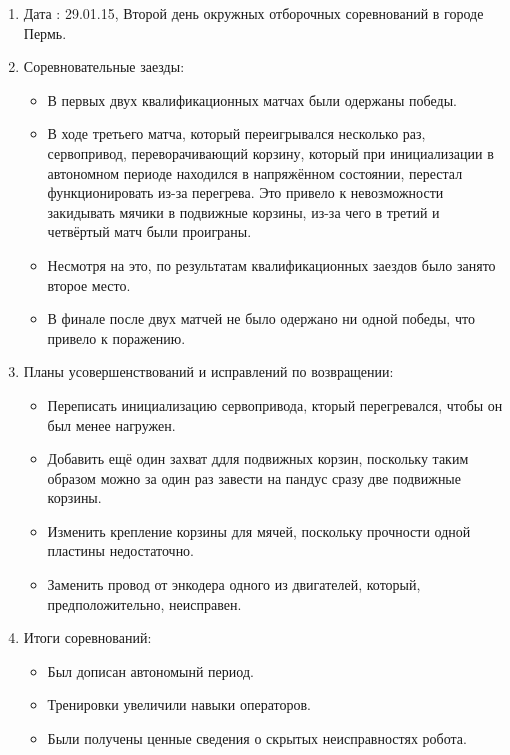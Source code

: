 \begin{enumerate}
  	
  \item Дата : 29.01.15, Второй день окружных отборочных соревнований в городе Пермь.
  
  \item Соревновательные заезды:
  \begin{itemize}
    \item В первых двух квалификационных матчах были одержаны победы.
		
	\item В ходе третьего матча, который переигрывался несколько раз, сервопривод, переворачивающий корзину, который при инициализации в автономном периоде находился в напряжённом состоянии, перестал функционировать из-за перегрева. Это привело к невозможности закидывать мячики в подвижные корзины, из-за чего в третий и четвёртый матч были проиграны.
	
	\item Несмотря на это, по результатам квалификационных заездов было занято второе место.
	
	\item В финале после двух матчей не было одержано ни одной победы, что привело к поражению.
  \end{itemize}

  \item Планы усовершенствований и исправлений по возвращении:
  \begin{itemize}
    \item Переписать инициализацию сервопривода, кторый перегревался, чтобы он был менее нагружен.
	
	\item Добавить ещё один захват ддля подвижных корзин, поскольку таким образом можно за один раз завести на пандус сразу две подвижные корзины.
    
    \item Изменить крепление корзины для мячей, поскольку прочности одной пластины недостаточно.
    
    \item Заменить провод от энкодера одного из двигателей, который, предположительно, неисправен.
  
  \end{itemize}
	
  \item Итоги соревнований:
  \begin{itemize}
	\item Был дописан автономынй период.
    
    \item Тренировки увеличили навыки операторов.
    
	\item Были получены ценные сведения о скрытых неисправностях робота.
	
  \end{itemize}
\end{enumerate}
\fillpage